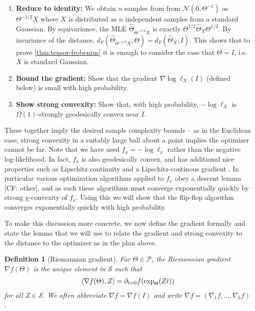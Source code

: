 \documentclass{article}
\newtheorem{definition}{Definition}
\newcommand\cN{\mathcal{N}}
\newcommand\Sym{\mathcal{S}}
\newcommand\SPD{\mathcal{P}}
\newcommand\samp{x}
\newcommand\rv{X}
\newcommand{\CF}[1]{{\color{purple}[CF: #1]}}
\begin{document}
\begin{enumerate}
\item\label{it:reduce} \textbf{Reduce to identity:} We obtain $n$ samples from from $\cN(0, \Theta^{-1})$ as $\Theta^{-1/2} \rv$ where $\rv$ is distributed as $n$ independent samples from a standard Gaussian.
By equivariance, the MLE $\widehat{\Theta}_{\Theta^{-1/2}\rv}$ is exactly $\Theta^{1/2} \widehat\Theta_{\rv} \Theta^{1/2}$. By invariance of the distance, $d_F(\widehat\Theta_{\Theta^{-1/2} \rv}; \Theta)
= d_F(\widehat\Theta_\rv; I).$ This shows that to prove \cref{thm:tensor-frobenius} it is enough to consider the case that $\Theta = I$, i.e. $\rv$ is standard Gaussian.
\item\label{it:grad} \textbf{Bound the gradient:}
Show that the gradient $\nabla \log \ell_{\rv}(I)$ (defined below) is small with high probability.
\item\label{it:convexity} \textbf{Show strong convexity:}
Show that, with high probability, $-\log\ell_{\rv}$ is $\Omega(1)$-strongly geodesically convex near $I$.
\end{enumerate}
These together imply the desired sample complexity bounds -- as in the Euclidean case, strong convexity in a suitably large ball about a point implies the optimizer cannot be far. Note that we have used $f_\samp=-\log\ell_\samp$ rather than the negative log-likelihood. In fact, $f_\samp$ is also geodesically convex, and has additional nice properties such as Lipschitz continuity and a Lipschitz-continous gradient \cite{burgisser2019towards}. In particular various optimization algorithms applied to $f_\samp$ obey a descent lemma \cite{burgisser2019towards} \CF{other}, and as such these algorithms must converge exponentially quickly by strong g-convexity of $f_\samp$. Using this we will show that the flip-flop algorithm converges exponentially quickly with high probability.

To make this discussion more concrete, we now define the gradient formally and state the lemma that we will use to relate the gradient and strong convexity to the distance to the optimizer as in the plan above.

\begin{definition}[Riemannian gradient]
For $\Theta \in \SPD$, the \emph{Riemannian gradient}~$\nabla f(\Theta)$ is the unique element in $\Sym$ such that
\begin{align*}
  \braket{\nabla f(\Theta), Z} = \partial_{t=0} f(\exp_{\Theta}(Zt))
\end{align*}
for all $Z\in \Sym$.
We often abbreviate $\nabla f = \nabla f(I)$ and write $\nabla f = (\nabla_1 f, \dots, \nabla_k f)$.
\end{definition}
\end{document}
